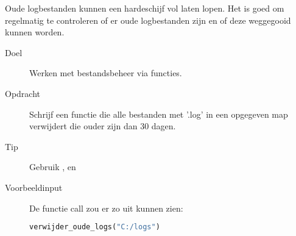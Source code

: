 Oude logbestanden kunnen een hardeschijf vol laten lopen. Het is goed om regelmatig te controleren of er oude logbestanden zijn en of deze weggegooid kunnen worden.
\begin{description}
\item[Doel] Werken met bestandsbeheer via functies.
\item[Opdracht] Schrijf een functie  die alle bestanden met '.log' in een opgegeven map verwijdert die ouder zijn dan 30 dagen.
\item[Tip] Gebruik ,  en 
\item[Voorbeeldinput] De functie call zou er zo uit kunnen zien:

\begin{lstlisting}[language=python]
verwijder_oude_logs("C:/logs")
\end{lstlisting}

\end{description}

